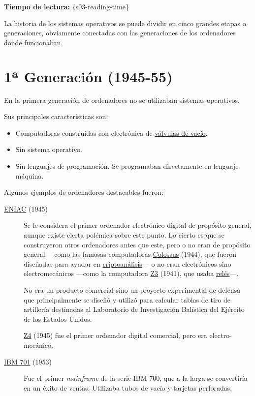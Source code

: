 \section{}

\textbf{Tiempo de lectura:} \{s03-reading-time\}

La historia de los sistemas operativos se puede dividir en cinco grandes
etapas o generaciones, obviamente conectadas con las generaciones de los
ordenadores donde funcionaban.

\section{1ª Generación
(1945-55)}\label{sect-historia-primera-generaciuxf3n}

En la primera generación de ordenadores no se utilizaban sistemas
operativos.

Sus principales características son:

\begin{itemize}
\item
  Computadoras construidas con electrónica de
  \href{https://es.wikipedia.org/wiki/V\%C3\%A1lvula_termoi\%C3\%B3nica}{válvulas
  de vacío}.
\item
  Sin sistema operativo.
\item
  Sin lenguajes de programación. Se programaban directamente en lenguaje
  máquina.
\end{itemize}

Algunos ejemplos de ordenadores destacables fueron:

\begin{description}
\item[\href{https://es.wikipedia.org/wiki/ENIAC}{ENIAC} (1945)]
Se le considera el primer ordenador electrónico digital de propósito
general, aunque existe cierta polémica sobre este punto. Lo cierto es
que se construyeron otros ordenadores antes que este, pero o no eran de
propósito general ---como las famosas computadoras
\href{https://es.wikipedia.org/wiki/Colossus}{Colossus} (1944), que
fueron diseñadas para ayudar en
\href{https://es.wikipedia.org/wiki/Criptoan\%C3\%A1lisis}{criptoanálisis}---
o no eran electrónicos sino electromecánicos ---como la computadora
\href{https://es.wikipedia.org/wiki/Z3}{Z3} (1941), que usaba
\href{https://es.wikipedia.org/wiki/Rel\%C3\%A9}{relés}---.

No era un producto comercial sino un proyecto experimental de defensa
que principalmente se diseñó y utilizó para calcular tablas de tiro de
artillería destinadas al Laboratorio de Investigación Balística del
Ejército de los Estados Unidos.

\href{https://es.wikipedia.org/wiki/Z4}{Z4} (1945) fue el primer
ordenador digital comercial, pero era electro-mecánico.
\item[\href{https://es.wikipedia.org/wiki/IBM_701}{IBM 701} (1953)]
Fue el primer \emph{mainframe} de la serie IBM 700, que a la larga se
convertiría en un éxito de ventas. Utilizaba tubos de vacío y tarjetas
perforadas.
\end{description}

